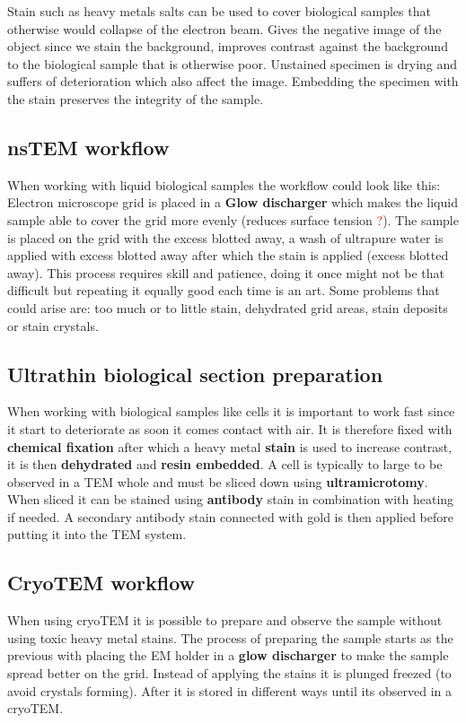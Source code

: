 	Stain such as heavy metals salts can be used to cover biological samples that otherwise would collapse of the electron beam. Gives the negative image of the object since we stain the background, improves contrast against the background to the biological sample that is otherwise poor. Unstained specimen is drying and suffers of deterioration which also affect the image. Embedding the specimen with the stain preserves the integrity of the sample. 

	\subsection{nsTEM workflow}
	When working with liquid biological samples the workflow could look like this: Electron microscope grid is placed in a \textbf{Glow discharger} which makes the liquid sample able to cover the grid more evenly (reduces surface tension \textcolor{red}{?}). The sample is placed on the grid with the excess blotted away, a wash of ultrapure water is applied with excess blotted away after which the stain is applied (excess blotted away). This process requires skill and patience, doing it once might not be that difficult but repeating it equally good each time is an art. Some problems that could arise are: too much or to little stain, dehydrated grid areas, stain deposits or stain crystals.

	\subsection{Ultrathin biological section preparation}
	When working with biological samples like cells it is important to work fast since it start to deteriorate as soon it comes contact with air. It is therefore fixed with \textbf{chemical fixation} after which a heavy metal \textbf{stain} is used to increase contrast, it is then \textbf{dehydrated} and \textbf{resin embedded}. A cell is typically to large to be observed in a TEM whole and must be sliced down using \textbf{ultramicrotomy}. When sliced it can be stained using \textbf{antibody} stain in combination with heating if needed. A secondary antibody stain connected with gold is then applied before putting it into the TEM system. 

	\subsection{CryoTEM workflow}
	When using cryoTEM it is possible to prepare and observe the sample without using toxic heavy metal stains. The process of preparing the sample starts as the previous with placing the EM holder in a \textbf{glow discharger} to make the sample spread better on the grid. Instead of applying the stains it is plunged freezed (to avoid crystals forming). After it is stored in different ways until its observed in a cryoTEM. 

